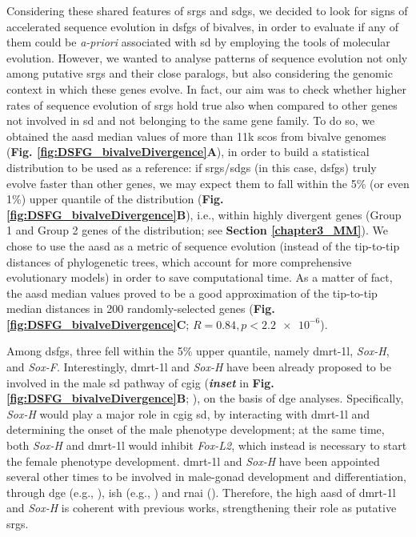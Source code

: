 \documentclass[../main.tex]{subfiles}
\begin{document}
Considering these shared features of \glspl{srg} and \glspl{sdg}, we decided to look for signs of accelerated sequence evolution in \glspl{dsfg} of bivalves, in order to evaluate if any of them could be \textit{a-priori} associated with \gls{sd} by employing the tools of molecular evolution. However, we wanted to analyse patterns of sequence evolution not only among putative \glspl{srg} and their close paralogs, but also considering the genomic context in which these genes evolve. In fact, our aim was to check whether higher rates of sequence evolution of \glspl{srg} hold true also when compared to other genes not involved in \gls{sd} and not belonging to the same gene family. To do so, we obtained the \gls{aasd} median values of more than 11k \glspl{sco} from bivalve genomes (\textbf{Fig. \ref{fig:DSFG_bivalveDivergence}A}), in order to build a statistical distribution to be used as a reference: if \glspl{srg}/\glspl{sdg} (in this case, \glspl{dsfg}) truly evolve faster than other genes, we may expect them to fall within the 5\% (or even 1\%) upper quantile of the distribution (\textbf{Fig. \ref{fig:DSFG_bivalveDivergence}B}), i.e., within highly divergent genes (Group 1 and Group 2 genes of the distribution; see \textbf{Section \ref{chapter3_MM}}). We chose to use the \gls{aasd} as a metric of sequence evolution (instead of the tip-to-tip distances of phylogenetic trees, which account for more comprehensive evolutionary models) in order to save computational time. As a matter of fact, the \gls{aasd} median values proved to be a good approximation of the tip-to-tip median distances in 200 randomly-selected genes (\textbf{Fig. \ref{fig:DSFG_bivalveDivergence}C}; $R = 0.84, p < \num{2.2e-6}$).

Among \glspl{dsfg}, three fell within the 5\% upper quantile, namely \gls{dmrt-1l}, \textit{Sox-H}, and \textit{Sox-F}. Interestingly, \gls{dmrt-1l} and \textit{Sox-H} have been already proposed to be involved in the male \gls{sd} pathway of \gls{cgig} (\textbf{\textit{inset}} in \textbf{Fig. \ref{fig:DSFG_bivalveDivergence}B}; \textbf{\cite{zhang2014genomic}}), on the basis of \gls{dge} analyses. Specifically, \textit{Sox-H} would play a major role in \gls{cgig} \gls{sd}, by interacting with \gls{dmrt-1l} and determining the onset of the male phenotype development; at the same time, both \textit{Sox-H} and \gls{dmrt-1l} would inhibit \textit{Fox-L2}, which instead is necessary to start the female phenotype development. \gls{dmrt-1l} and \textit{Sox-H} have been appointed several other times to be involved in male-gonad development and differentiation, through \gls{dge} (e.g., \textbf{\cite{teaniniuraitemoana2014gonad, capt2018deciphering, afonso2019gonad}}), \gls{ish} (e.g., \textbf{\cite{naimi2009molecular,li2018foxl2, yue2021variance, liang2019sox2}}) and \gls{rnai} (\textbf{\cite{liang2019sox2, sun2022examination}}). Therefore, the high \gls{aasd} of \gls{dmrt-1l} and \textit{Sox-H} is coherent with previous works, strengthening their role as putative \glspl{srg}.
\end{document}
